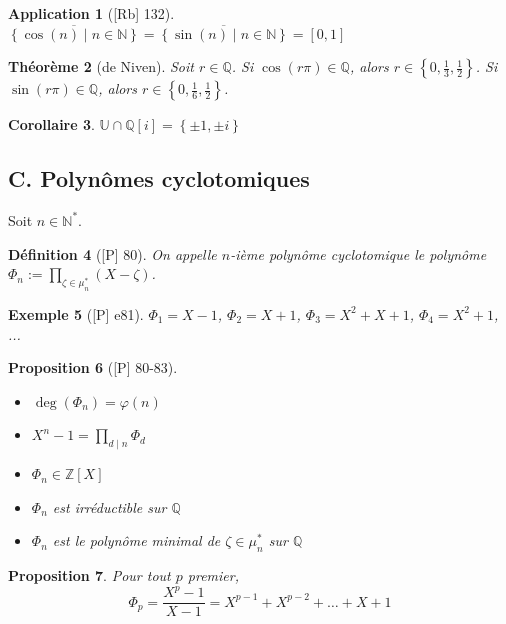 \documentclass[10pt, a4paper, parskip=full, twoside, twocolumn]{report}
\newtheorem{definition}{Définition}
\newtheorem{theorem}[definition]{Théorème}
\newtheorem{proposition}[definition]{Proposition}
\newtheorem{corollary}[definition]{Corollaire}
\newtheorem{example}[definition]{Exemple}
\newtheorem{application}[definition]{Application}
\newcommand{\IN}{\mathbb{N}}
\newcommand{\IZ}{\mathbb{Z}}
\newcommand{\IU}{\mathbb{U}}
\newcommand{\IQ}{\mathbb{Q}}
\begin{document}
\begin{application}[\textnormal{[Rb] 132}]
	$\overline{\left\{\cos (n) \mid n\in \IN\right\}} = \overline{\left\{\sin (n) \mid n\in \IN\right\}} = \left[0,1\right]$
\end{application}

\begin{theorem}[de Niven]
	Soit $r\in\IQ$. Si $\cos (r\pi)\in\IQ$, alors $r\in\left\{0, \frac{1}{3}, \frac{1}{2}\right\}$.
	Si $\sin(r\pi)\in\IQ$, alors $r\in\left\{0,\frac{1}{6}, \frac{1}{2}\right\}$.
\end{theorem}

\begin{corollary}
	$\IU\cap\IQ[i] = \left\{\pm 1, \pm i\right\}$
\end{corollary}

\subsection*{C. Polynômes cyclotomiques}
Soit $n\in \IN^*$.

\begin{definition}[\textnormal{[P] 80}]
	On appelle \emph{$n$-ième polynôme cyclotomique} le polynôme 
	$\Phi_n := \prod_{\zeta\in\mu_n^*} (X-\zeta)$.
\end{definition}

\begin{example}[\textnormal{[P] e81}]
	$\Phi_1 = X-1$, $\Phi_2 = X + 1$, $\Phi_3 = X^2 + X + 1$, $\Phi_4 = X^2 + 1$, ...
\end{example}

\begin{proposition}[\textnormal{[P] 80-83}]
	\begin{itemize}
		\item[$\vartriangleright$] $\deg(\Phi_n) = \varphi(n)$
		\item[$\vartriangleright$] $X^n - 1 = \prod_{d\mid n} \Phi_d$
		\item[$\vartriangleright$] $\Phi_n\in\IZ[X]$
		\item[$\vartriangleright$] $\Phi_n$ est irréductible sur $\IQ$
		\item[$\vartriangleright$] $\Phi_n$ est le polynôme minimal de $\zeta\in\mu_n^*$ sur $\IQ$
	\end{itemize}
\end{proposition}

\begin{proposition}
	Pour tout $p$ premier, 
	$$\Phi_p = \frac{X^p - 1}{X-1} = X^{p-1} + X^{p-2} + \dots + X + 1$$
\end{proposition}
\end{document}
